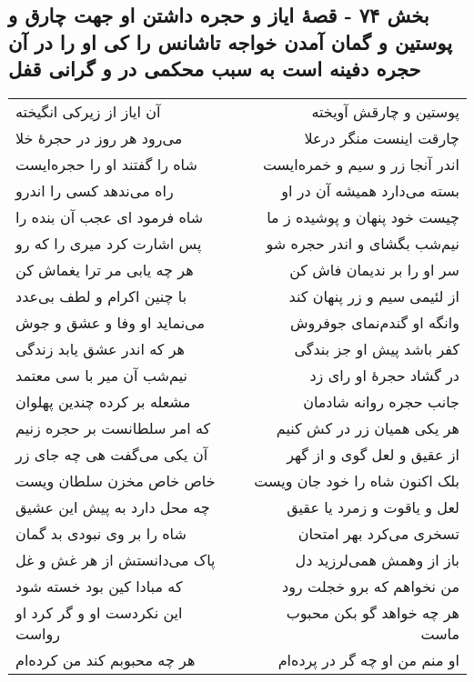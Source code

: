 \begin{center}
\section*{بخش ۷۴ - قصهٔ ایاز و حجره داشتن او جهت چارق و پوستین و گمان آمدن خواجه تاشانس را کی او را در آن حجره دفینه است به سبب  محکمی در و گرانی قفل}
\label{sec:sh074}
\begin{longtable}{l p{0.5cm} r}
آن ایاز از زیرکی انگیخته
&&
پوستین و چارقش آویخته
\\
می‌رود هر روز در حجرهٔ خلا
&&
چارقت اینست منگر درعلا
\\
شاه را گفتند او را حجره‌ایست
&&
اندر آنجا زر و سیم و خمره‌ایست
\\
راه می‌ندهد کسی را اندرو
&&
بسته می‌دارد همیشه آن در او
\\
شاه فرمود ای عجب آن بنده را
&&
چیست خود پنهان و پوشیده ز ما
\\
پس اشارت کرد میری را که رو
&&
نیم‌شب بگشای و اندر حجره شو
\\
هر چه یابی مر ترا یغماش کن
&&
سر او را بر ندیمان فاش کن
\\
با چنین اکرام و لطف بی‌عدد
&&
از لئیمی سیم و زر پنهان کند
\\
می‌نماید او وفا و عشق و جوش
&&
وانگه او گندم‌نمای جوفروش
\\
هر که اندر عشق یابد زندگی
&&
کفر باشد پیش او جز بندگی
\\
نیم‌شب آن میر با سی معتمد
&&
در گشاد حجرهٔ او رای زد
\\
مشعله بر کرده چندین پهلوان
&&
جانب حجره روانه شادمان
\\
که امر سلطانست بر حجره زنیم
&&
هر یکی همیان زر در کش کنیم
\\
آن یکی می‌گفت هی چه جای زر
&&
از عقیق و لعل گوی و از گهر
\\
خاص خاص مخزن سلطان ویست
&&
بلک اکنون شاه را خود جان ویست
\\
چه محل دارد به پیش این عشیق
&&
لعل و یاقوت و زمرد یا عقیق
\\
شاه را بر وی نبودی بد گمان
&&
تسخری می‌کرد بهر امتحان
\\
پاک می‌دانستش از هر غش و غل
&&
باز از وهمش همی‌لرزید دل
\\
که مبادا کین بود خسته شود
&&
من نخواهم که برو خجلت رود
\\
این نکردست او و گر کرد او رواست
&&
هر چه خواهد گو بکن محبوب ماست
\\
هر چه محبوبم کند من کرده‌ام
&&
او منم من او چه گر در پرده‌ام
\\

\end{longtable}
\end{center}
